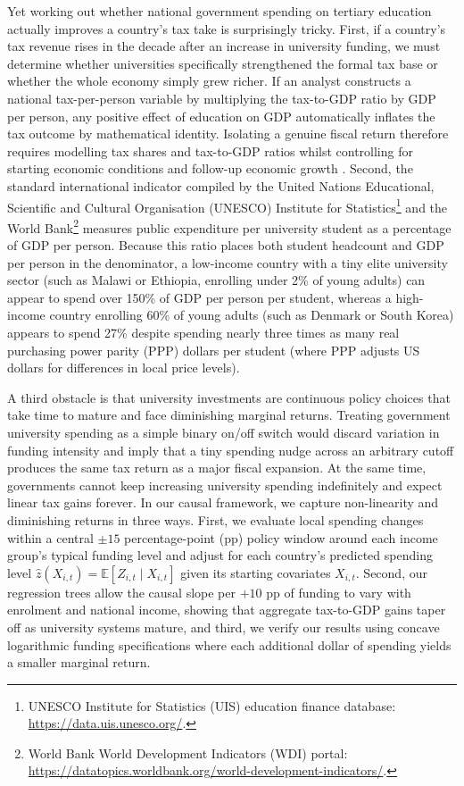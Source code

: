 \documentclass[11pt,a4paper]{article}
\begin{document}
Yet working out whether national government spending on tertiary education actually improves a country's tax take is surprisingly tricky. First, if a country's tax revenue rises in the decade after an increase in university funding, we must determine whether universities specifically strengthened the formal tax base or whether the whole economy simply grew richer. If an analyst constructs a national tax-per-person variable by multiplying the tax-to-GDP ratio by GDP per person, any positive effect of education on GDP automatically inflates the tax outcome by mathematical identity. Isolating a genuine fiscal return therefore requires modelling tax shares and tax-to-GDP ratios whilst controlling for starting economic conditions and follow-up economic growth \citep{imai2010general, acharya2016explaining, vanderweele2016mediation}. Second, the standard international indicator compiled by the United Nations Educational, Scientific and Cultural Organisation (UNESCO) Institute for Statistics\footnote{UNESCO Institute for Statistics (UIS) education finance database: \url{https://data.uis.unesco.org/}.} and the World Bank\footnote{\raggedright World Bank World Development Indicators (WDI) portal: \url{https://datatopics.worldbank.org/world-development-indicators/}.} measures public expenditure per university student as a percentage of GDP per person. Because this ratio places both student headcount and GDP per person in the denominator, a low-income country with a tiny elite university sector (such as Malawi or Ethiopia, enrolling under 2\% of young adults) can appear to spend over 150\% of GDP per person per student, whereas a high-income country enrolling 60\% of young adults (such as Denmark or South Korea) appears to spend 27\% despite spending nearly three times as many real purchasing power parity (PPP) dollars per student (where PPP adjusts US dollars for differences in local price levels).

A third obstacle is that university investments are continuous policy choices that take time to mature and face diminishing marginal returns. Treating government university spending as a simple binary on/off switch would discard variation in funding intensity and imply that a tiny spending nudge across an arbitrary cutoff produces the same tax return as a major fiscal expansion. At the same time, governments cannot keep increasing university spending indefinitely and expect linear tax gains forever. In our causal framework, we capture non-linearity and diminishing returns in three ways. First, we evaluate local spending changes within a central $\pm 15$ percentage-point (pp) policy window around each income group's typical funding level and adjust for each country's predicted spending level $\hat{z}(X_{i,t}) = \mathbb{E}[Z_{i,t} \mid X_{i,t}]$ given its starting covariates $X_{i,t}$. Second, our regression trees allow the causal slope per $+10$ pp of funding to vary with enrolment and national income, showing that aggregate tax-to-GDP gains taper off as university systems mature, and third, we verify our results using concave logarithmic funding specifications where each additional dollar of spending yields a smaller marginal return.
\end{document}
